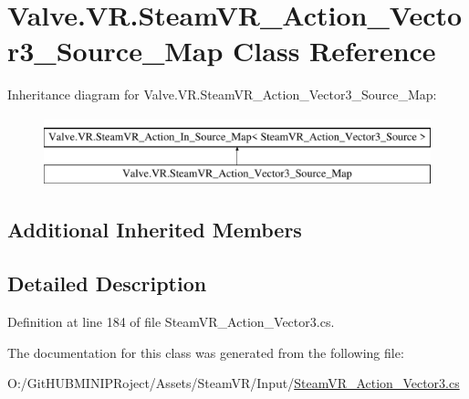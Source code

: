 \hypertarget{class_valve_1_1_v_r_1_1_steam_v_r___action___vector3___source___map}{}\section{Valve.\+V\+R.\+Steam\+V\+R\+\_\+\+Action\+\_\+\+Vector3\+\_\+\+Source\+\_\+\+Map Class Reference}
\label{class_valve_1_1_v_r_1_1_steam_v_r___action___vector3___source___map}
Inheritance diagram for Valve.\+V\+R.\+Steam\+V\+R\+\_\+\+Action\+\_\+\+Vector3\+\_\+\+Source\+\_\+\+Map\+:\begin{figure}[H]
\begin{center}
\leavevmode
\includegraphics[height=2.000000cm]{class_valve_1_1_v_r_1_1_steam_v_r___action___vector3___source___map}
\end{center}
\end{figure}
\subsection*{Additional Inherited Members}


\subsection{Detailed Description}


Definition at line 184 of file Steam\+V\+R\+\_\+\+Action\+\_\+\+Vector3.\+cs.



The documentation for this class was generated from the following file\+:\begin{DoxyCompactItemize}
\item 
O\+:/\+Git\+H\+U\+B\+M\+I\+N\+I\+P\+Roject/\+Assets/\+Steam\+V\+R/\+Input/\mbox{\hyperlink{_steam_v_r___action___vector3_8cs}{Steam\+V\+R\+\_\+\+Action\+\_\+\+Vector3.\+cs}}\end{DoxyCompactItemize}
